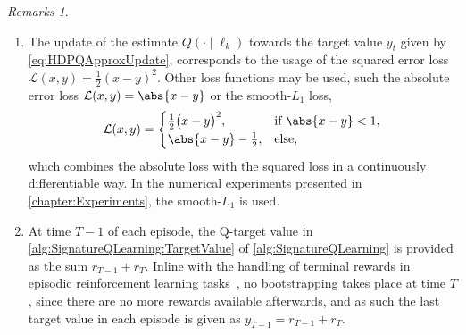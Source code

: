 \documentclass[
    a4paper,
    11pt,
    bibliography=totoc,
    listof=totoc,      
    headinclude=true,
    cleardoublepage=empty,
]{scrbook}
\theoremstyle{plain}
\theoremstyle{definition}
\theoremstyle{remark}
\newtheorem{remarks}[theorem]{Remarks}
\begin{document}
\begin{remarks}
\label{rem:SignatureQAlgoRemarks}
    \begin{enumerate}
        \item The update of the estimate $Q(\cdot \mid \ell_k)$ towards the
        target value $y_t$ given by \cref{eq:HDPQApproxUpdate}, corresponds to
        the usage of the squared error loss $\mathcal{L}(x,y) = \frac{1}{2}
        (x-y)^2$. Other loss functions may be used,
        such the absolute error loss $\mathcal{L}(x,y) = \abs{x-y}$ or the 
        smooth-$L_1$ loss,
        \begin{equation}
        \label{eq:SmoothL1Loss}
            \mathcal{L}(x,y)
            = \begin{cases}
                \frac{1}{2} \big(x-y\big)^2, & 
                    \mbox{if } \abs{x-y} < 1, \\
                \abs{x-y} - \frac{1}{2}, & 
                    \mbox{else},
            \end{cases}                     
        \end{equation}
        which combines the absolute loss with the squared loss in a continuously
        differentiable way. In the numerical experiments presented in
        \cref{chapter:Experiments}, the smooth-$L_1$ is used.

        \item At time $T-1$ of each episode, the Q-target value in
        \cref{alg:SignatureQLearning:TargetValue} of
        \cref{alg:SignatureQLearning} is provided as the sum $r_{T-1} + r_T$.
        Inline with the handling of terminal rewards in episodic reinforcement learning tasks~\cite{pardo2018_tlrl}, no
        bootstrapping takes place at time $T$, since there are no more rewards
        available afterwards, and as such the last target value in each
        episode is given as $y_{T-1} = r_{T-1} + r_T$.
        

\end{enumerate}
\end{remarks}
\end{document}
